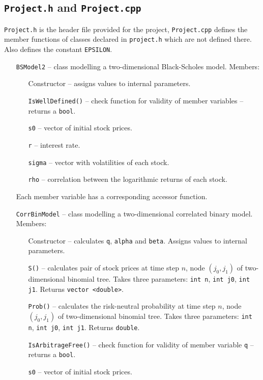 \documentclass[12pt,a4paper]{article}
\begin{document}
\subsection{\texttt{Project.h} and \texttt{Project.cpp}}
\texttt{Project.h} is the header file provided for the project, 
\texttt{Project.cpp} defines the member functions of classes declared in 
\texttt{project.h} which are not defined there. Also defines the constant 
\texttt{EPSILON}.
\begin{itemize}
	\item[\texttt{BSModel2}] -- class modelling a two-dimensional Black-Scholes 
model. Members:
	\begin{itemize}
		\item[Constructor] -- assigns values to internal parameters.
		\item[\texttt{IsWellDefined()}] -- check function for validity of member 
variables -- returns a \texttt{bool}.
		\item[\texttt{s0}] -- vector of initial stock prices.
		\item[\texttt{r}] -- interest rate.
		\item[\texttt{sigma}] -- vector with volatilities of each stock.
		\item[\texttt{rho}] -- correlation between the logarithmic returns of each 
stock.
	\end{itemize}
	Each member variable has a corresponding accessor function.
	\item[\texttt{CorrBinModel}] -- class modelling a two-dimensional correlated 
binary model. Members:
	\begin{itemize}
		\item[Constructor] -- calculates \texttt{q}, \texttt{alpha} and \texttt{beta}. 
Assigns values to internal parameters. 
		\item[\texttt{S()}] -- calculates pair of stock prices at time step $n$, node 
$(j_0,j_1)$ of two-dimensional binomial tree. Takes three parameters: 
\texttt{int n}, \texttt{int j0}, \texttt{int j1}. Returns \texttt{vector 
<double>}.
		\item[\texttt{Prob()}] -- calculates the risk-neutral probability at time step 
$n$, node $(j_0,j_1)$ of two-dimensional binomial tree. Takes three parameters: 
\texttt{int n}, \texttt{int j0}, \texttt{int j1}. Returns \texttt{double}.
		\item[\texttt{IsArbitrageFree()}] -- check function for validity of member 
variable \texttt{q} -- returns a \texttt{bool}.
		\item[\texttt{s0}] -- vector of initial stock prices.

\end{itemize}
\end{itemize}
\end{document}

